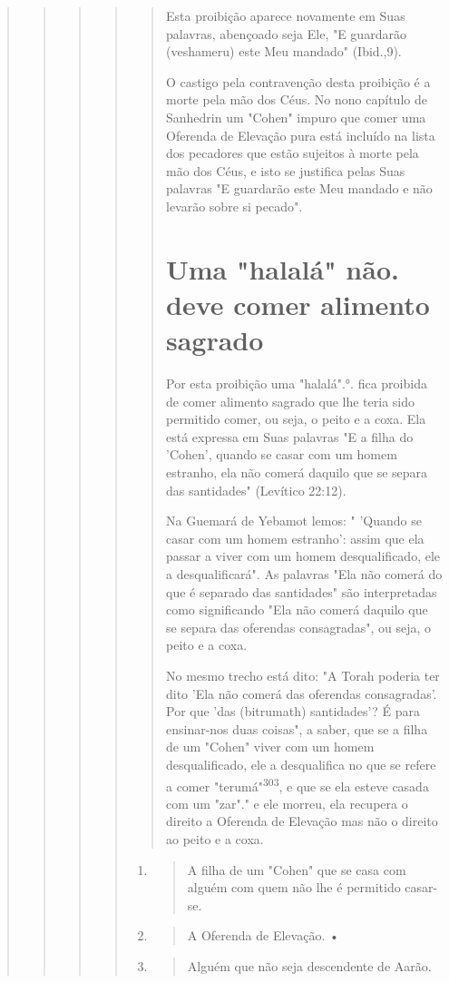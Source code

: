 \begin{quote}
\begin{quote}
\begin{quote}
\begin{quote}
\begin{quote}
Esta proibição aparece novamente em Suas palavras, abençoado se­ja Ele,
"E guardarão (veshameru) este Meu mandado" (Ibid.,9).

O castigo pela contravenção desta proibição é a morte pela mão dos Céus.
No nono capítulo de Sanhedrin um "Cohen" impuro que comer uma Ofe­renda
de Elevação pura está incluído na lista dos pecadores que estão sujeitos
à morte pela mão dos Céus, e isto se justifica pelas Suas palavras "E
guardarão este Meu mandado e não levarão sobre si pecado".

\section{Uma "halalá" não. deve comer alimento sagrado}

Por esta proibição uma "halalá".°.
fica proibida de comer alimento sagrado que lhe teria sido permitido
comer, ou seja, o peito e a coxa. Ela está expressa em Suas palavras "E
a filha do 'Cohen', quando se casar com um ho­mem estranho, ela não
comerá daquilo que se separa das santidades" (Levítico 22:12).

Na Guemará de Yebamot lemos: " 'Quando se casar com um homem estranho':
assim que ela passar a viver com um homem desqualificado, ele a
desqualificará". As palavras "Ela não comerá do que é separado das
santida­des" são interpretadas como significando "Ela não comerá daquilo
que se se­para das oferendas consagradas", ou seja, o peito e a coxa.

No mesmo trecho está dito: "A Torah poderia ter dito 'Ela não co­merá
das oferendas consagradas'. Por que 'das (bitrumath) santidades'? É para
ensinar-nos duas coisas", a saber, que se a filha de um "Cohen" viver
com um homem desqualificado, ele a desqualifica no que se refere a comer
"teru­má"\textsuperscript{303}, e que se ela esteve casada com um
"zar"." e ele morreu, ela recupera o direito a
Oferenda de Elevação mas não o direito ao peito e a coxa.
\end{quote}

\begin{enumerate}
\def\labelenumi{\arabic{enumi}.}
\setcounter{enumi}{301}
\item
 \begin{quote}
 A filha de um "Cohen" que se casa com alguém com quem não lhe é
 permitido casar-se.
 \end{quote}
\item
 \begin{quote}
 A Oferenda de Elevação. •
 \end{quote}
\item
 \begin{quote}
 Alguém que não seja descendente de Aarão.
 \end{quote}
\end{enumerate}


\end{quote}
\end{quote}
\end{quote}
\end{quote}
